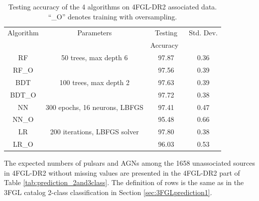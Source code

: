 \begin{table}[!h]
\centering
    \tiny
    \renewcommand{\tabcolsep}{0.4mm}
\renewcommand{\arraystretch}{1.6}

    \begin{tabular}{ c c c c }
    \hline
    \hline
    Algorithm&Parameters &  Testing&Std. Dev.\\
    & & Accuracy\ &  \\
    \hline
    RF& 50 trees, max depth 6  &97.87 & 0.36\\
    RF\_O   &&97.56&0.39 \\
    \hline
    BDT & 100 trees, max depth 2    &   97.63 &0.39\\
    BDT\_O&&97.72&0.38\\
    \hline
    NN & 300 epochs, 16 neurons, LBFGS  & 97.41 & 0.47\\
    NN\_O&&95.48&0.66\\
    \hline
    LR & 200 iterations, LBFGS solver & 97.80&0.38\\
    LR\_O&&96.03&0.53\\
    \hline
     
    \end{tabular}%
    \vspace{0.2cm}
    \caption{Testing accuracy of the 4 algorithms on 4FGL-DR2 associated data. ``\_O'' denotes training with oversampling.}
    \label{tab:selected_algs2}
\end{table}

The expected numbers of pulsars and AGNs among the 1658 unassociated sources in 4FGL-DR2 without missing values are
presented in the 4FGL-DR2 part of Table \ref{tab:prediction_2and3class}.
The definition of rows is the same as in the 3FGL catalog 2-class classification in Section \ref{sec:3FGLprediction1}.

